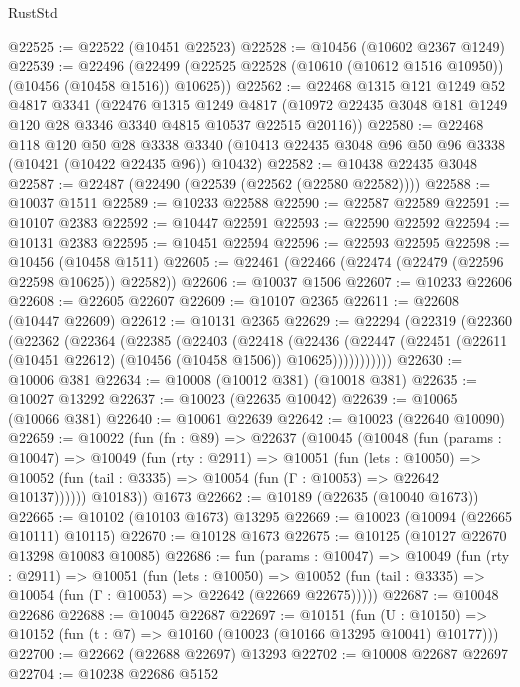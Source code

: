 \begin{lexlean}{RustStd}
\begin{coremodule}
@22525 := @22522 (@10451 @22523)
@22528 := @10456 (@10602 @2367 @1249)
@22539 := @22496
    (@22499 (@22525 @22528 (@10610 (@10612 @1516 @10950)) (@10456 (@10458 @1516)) @10625))
@22562 := @22468
    @1315
    @121
    @1249
    @52
    @4817
    @3341
    (@22476
      @1315
      @1249
      @4817
      (@10972 @22435 @3048 @181 @1249 @120 @28 @3346 @3340 @4815 @10537 @22515 @20116))
@22580 := @22468
    @118
    @120
    @50
    @28
    @3338
    @3340
    (@10413 @22435 @3048 @96 @50 @96 @3338 (@10421 (@10422 @22435 @96)) @10432)
@22582 := @10438 @22435 @3048
@22587 := @22487 (@22490 (@22539 (@22562 (@22580 @22582))))
@22588 := @10037 @1511
@22589 := @10233 @22588
@22590 := @22587 @22589
@22591 := @10107 @2383
@22592 := @10447 @22591
@22593 := @22590 @22592
@22594 := @10131 @2383
@22595 := @10451 @22594
@22596 := @22593 @22595
@22598 := @10456 (@10458 @1511)
@22605 := @22461 (@22466 (@22474 (@22479 (@22596 @22598 @10625)) @22582))
@22606 := @10037 @1506
@22607 := @10233 @22606
@22608 := @22605 @22607
@22609 := @10107 @2365
@22611 := @22608 (@10447 @22609)
@22612 := @10131 @2365
@22629 := @22294
    (@22319
      (@22360
        (@22362
          (@22364
            (@22385
              (@22403
                (@22418
                  (@22436
                    (@22447
                      (@22451 (@22611 (@10451 @22612) (@10456 (@10458 @1506)) @10625)))))))))))
@22630 := @10006 @381
@22634 := @10008 (@10012 @381) (@10018 @381)
@22635 := @10027 @13292
@22637 := @10023 (@22635 @10042)
@22639 := @10065 (@10066 @381)
@22640 := @10061 @22639
@22642 := @10023 (@22640 @10090)
@22659 := @10022
    (fun (fn : @89) =>
    @22637
      (@10045
        (@10048
          (fun (params : @10047) =>
          @10049
            (fun (rty : @2911) =>
            @10051
              (fun (lets : @10050) =>
              @10052 (fun (tail : @3335) => @10054 (fun (Γ : @10053) => @22642 @10137))))))
        @10183))
    @1673
@22662 := @10189 (@22635 (@10040 @1673))
@22665 := @10102 (@10103 @1673) @13295
@22669 := @10023 (@10094 (@22665 @10111) @10115)
@22670 := @10128 @1673
@22675 := @10125 (@10127 @22670 @13298 @10083 @10085)
@22686 := fun (params : @10047) =>
  @10049
    (fun (rty : @2911) =>
    @10051
      (fun (lets : @10050) =>
      @10052 (fun (tail : @3335) => @10054 (fun (Γ : @10053) => @22642 (@22669 @22675)))))
@22687 := @10048 @22686
@22688 := @10045 @22687
@22697 := @10151
    (fun (U : @10150) => @10152 (fun (t : @7) => @10160 (@10023 (@10166 @13295 @10041) @10177)))
@22700 := @22662 (@22688 @22697) @13293
@22702 := @10008 @22687 @22697
@22704 := @10238 @22686 @5152

\end{coremodule}
\end{lexlean}
